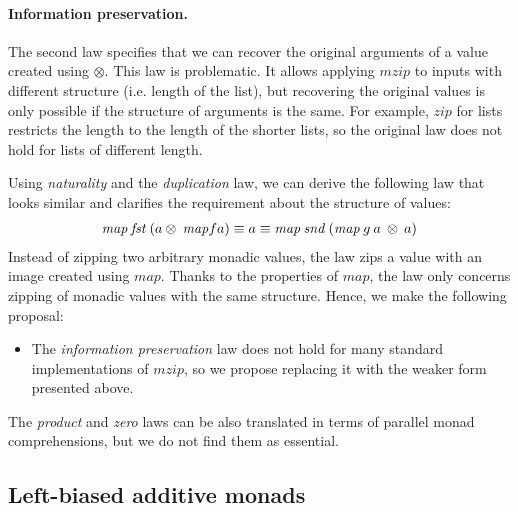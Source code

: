 \documentclass{sigplanconf}
\newcommand{\Varid}[1]{\mathit{#1}}
\begin{document}
\paragraph{Information preservation.}
The second law specifies that we can recover the original arguments of a value created using 
\ensuremath{\otimes}. This law is problematic. It allows applying \ensuremath{\Varid{mzip}} to inputs with different structure 
(i.e. length of the list), but recovering the original values is only possible if 
the structure of arguments is the same. For example, \ensuremath{\Varid{zip}} for lists restricts the length to the
length of the shorter lists, so the original law does not hold for lists of different length.

Using \textit{naturality} and the \textit{duplication} law, we can derive the
following law that looks similar and clarifies the requirement about the structure of values:
\begin{align*}
  \map \: \Varid{fst} \: (a \mzip \: \map f a) \equiv a \equiv \map \: \Varid{snd} \: (\map \: g \: a \: \mzip \: a)
\end{align*}
Instead of zipping two arbitrary monadic values, the law zips a value with an image created using 
\ensuremath{\Varid{map}}. Thanks to the properties of \ensuremath{\Varid{map}}, the law only concerns zipping of monadic values with the 
same structure. Hence, we make the following proposal:

\begin{itemize}
\item The \textit{information preservation} law does not hold for many standard implementations of 
  \ensuremath{\Varid{mzip}}, so we propose replacing it with the weaker form presented above.

%
\end{itemize}
The \textit{product} and \textit{zero} laws can be also translated in terms of parallel
monad comprehensions, but we do not find them as essential.


\subsection{Left-biased additive monads}
\label{sec:proposals-morelse}
\end{document}
